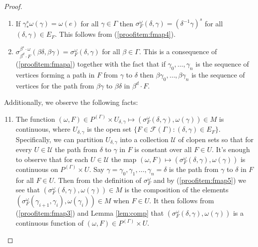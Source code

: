 \documentclass[10pt,a4paper]{amsart}
\def\cal{\mathcal}
\begin{document}
\begin{proof}
\begin{enumerate}
\begin{align*}
			\sigma_F^\omega(\delta, \gamma) & = \sigma_F^\omega(\delta, \beta') \circ \sigma_F^\omega(\beta', \gamma).
		\end{align*}
		The right-sides of these two equations are $\omega(\gamma)$-almost-everywhere equal since $\sigma_F^\omega(\beta', \gamma)$ pushes $\omega(\gamma)$ forward to $\omega(\beta')$ by (\ref{proofitem:fmap5}) and $\sigma_F^\omega(\beta', \beta) \circ \sigma_F^\omega(\beta, \beta')$ is $\omega(\beta')$-almost-everywhere equal to the identity by (\ref{proofitem:fmap7}). This establishes the claim.
		\item \label{proofitem:fmap10} If $\gamma^s_* \omega(\gamma) = \omega(e)$ for all $\gamma \in \Gamma$ then $\sigma_F^\omega(\delta, \gamma) = (\delta^{-1} \gamma)^s$ for all $(\delta, \gamma) \in E_F$. This follows from (\ref{proofitem:fmap4}).
		\item \label{proofitem:fmapb} $\sigma_{\beta^d \cdot F}^{\beta^s \cdot \omega}(\beta \delta, \beta \gamma) = \sigma_F^\omega(\delta, \gamma)$ for all $\beta \in \Gamma$. This is a consequence of (\ref{proofitem:fmapa}) together with the fact that if $\gamma_0, \ldots, \gamma_n$ is the sequence of vertices forming a path in $F$ from $\gamma$ to $\delta$ then $\beta \gamma_0, \ldots, \beta \gamma_n$ is the sequence of vertices for the path from $\beta \gamma$ to $\beta \delta$ in $\beta^d \cdot F$.
	\end{enumerate}
	Additionally, we observe the following facts:
	\begin{enumerate}\setcounter{enumi}{10}
		\item \label{proofitem:fmapc} The function $(\omega, F) \in P^{(\Gamma)} \times U_{\delta, \gamma} \mapsto (\sigma^\omega_F(\delta, \gamma), \omega(\gamma)) \in M$ is continuous, where $U_{\delta, \gamma}$ is the open set $\{F \in \cal F(\Gamma) : (\delta, \gamma) \in E_F\}$. Specifically, we can partition $U_{\delta, \gamma}$ into a collection $\cal U$ of clopen sets so that for every $U \in \cal U$ the path from $\delta$ to $\gamma$ in $F$ is constant over all $F \in U$. It's enough to observe that for each $U \in \cal U$ the map $(\omega, F) \mapsto (\sigma^\omega_F(\delta, \gamma), \omega(\gamma))$ is continuous on $P^{(\Gamma)} \times U$. Say $\gamma = \gamma_0, \gamma_1, \ldots, \gamma_n = \delta$ is the path from $\gamma$ to $\delta$ in $F$ for all $F \in U$. Then from the definition of $\sigma^\omega_F$ and by (\ref{proofitem:fmap5}) we see that $(\sigma^\omega_F(\delta, \gamma), \omega(\gamma)) \in M$ is the composition of the elements $(\sigma^\omega_F(\gamma_{i+1}, \gamma_i), \omega(\gamma_i)) \in M$ when $F \in U$. It then follows from (\ref{proofitem:fmap3}) and Lemma \ref{lem:comp} that $(\sigma^\omega_F(\delta, \gamma), \omega(\gamma))$ is a continuous function of $(\omega, F) \in P^{(\Gamma)} \times U$.

\end{enumerate}
\end{proof}
\end{document}
